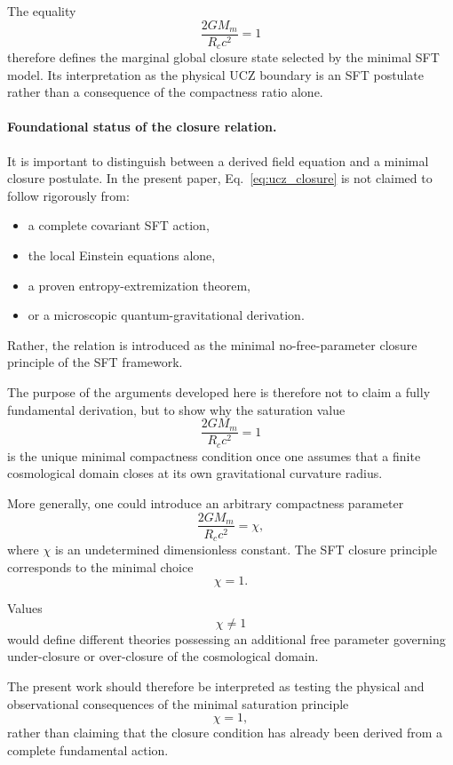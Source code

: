 \documentclass[12pt]{article}
\begin{document}
The equality
\[
\boxed{
\frac{2GM_m}{R_c c^2}=1
}
\]
therefore defines the marginal global closure state selected by the
minimal SFT model. Its interpretation as the physical UCZ boundary is
an SFT postulate rather than a consequence of the compactness ratio
alone.

\paragraph{Foundational status of the closure relation.}

It is important to distinguish between a derived field equation and a
minimal closure postulate.
In the present paper,
Eq.~\eqref{eq:ucz_closure}
is not claimed to follow rigorously from:
\begin{itemize}
\item a complete covariant SFT action,
\item the local Einstein equations alone,
\item a proven entropy-extremization theorem,
\item or a microscopic quantum-gravitational derivation.
\end{itemize}

Rather, the relation is introduced as the minimal no-free-parameter
closure principle of the SFT framework.

The purpose of the arguments developed here is therefore not to claim a
fully fundamental derivation, but to show why the saturation value
\[
\frac{2GM_m}{R_c c^2}=1
\]
is the unique minimal compactness condition once one assumes that a
finite cosmological domain closes at its own gravitational curvature
radius.

More generally, one could introduce an arbitrary compactness parameter
\begin{equation}
\frac{2GM_m}{R_c c^2}=\chi,
\label{eq:chi_general}
\end{equation}
where $\chi$ is an undetermined dimensionless constant.
The SFT closure principle corresponds to the minimal choice
\begin{equation}
\boxed{
\chi=1.
}
\end{equation}

Values
\[
\chi\neq1
\]
would define different theories possessing an additional free parameter
governing under-closure or over-closure of the cosmological domain.

The present work should therefore be interpreted as testing the physical
and observational consequences of the minimal saturation principle
\[
\chi=1,
\]
rather than claiming that the closure condition has already been derived
from a complete fundamental action.
\end{document}
